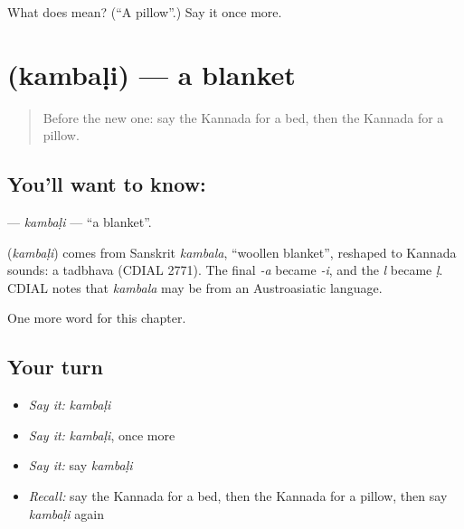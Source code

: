 \begin{tcolorbox}[breakable,colback=teal!4,colframe=teal!35!black,title={Before you move on}]
What does  mean? (\textquotedblleft{}A pillow\textquotedblright{}.) Say it once more.
\end{tcolorbox}
\section[\texorpdfstring{\kn{ಕಂಬಳಿ} (kambaḷi)}{ಕಂಬಳಿ (kambaḷi)}]{ (kambaḷi) — a blanket}

\label{lesson:KA-C116-kambali}



\begin{quote}
Before the new one: say the Kannada for a bed, then the Kannada for a pillow.
\end{quote}

\subsection*{You'll want to know: }
\textbf{} — \emph{kambaḷi} — \textquotedblleft{}a blanket\textquotedblright{}.

\begin{cousinweb}
\textbf{} (\emph{kambaḷi}) comes from Sanskrit \emph{kambala}, \textquotedblleft{}woollen blanket\textquotedblright{}, reshaped to Kannada sounds: a tadbhava (CDIAL 2771). The final \emph{-a} became \emph{-i}, and the \emph{l} became \emph{ḷ}. CDIAL notes that \emph{kambala} may be from an Austroasiatic language.
\end{cousinweb}

\begin{grammarlens}[title={What you've built}]
One more word for this chapter.
\end{grammarlens}

\subsection*{Your turn}
\begin{itemize}
\raggedright
  \item \emph{Say it:} \emph{kambaḷi}
  \item \emph{Say it:} \emph{kambaḷi}, once more
  \item \emph{Say it:} say \emph{kambaḷi}
  \item \emph{Recall:} say the Kannada for a bed, then the Kannada for a pillow, then say \emph{kambaḷi} again
\end{itemize}

